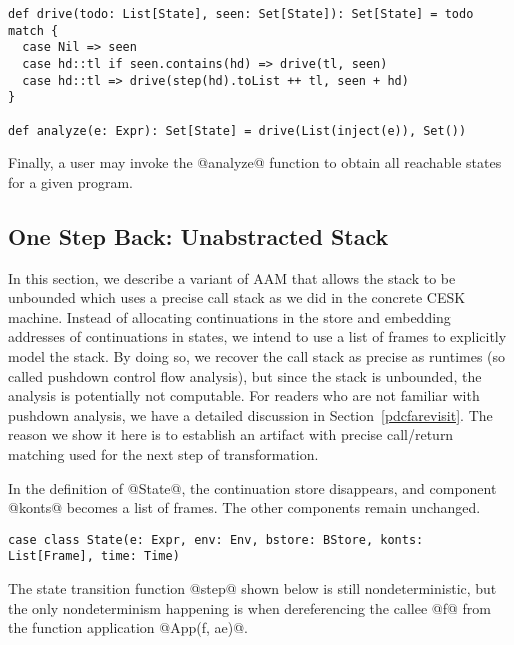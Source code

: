 \documentclass[acmsmall,review,anonymous]{acmart}\settopmatter{printfolios=true,printccs=false,printacmref=false}
\begin{document}
\begin{lstlisting}
def drive(todo: List[State], seen: Set[State]): Set[State] = todo match {
  case Nil => seen
  case hd::tl if seen.contains(hd) => drive(tl, seen)
  case hd::tl => drive(step(hd).toList ++ tl, seen + hd)
}

def analyze(e: Expr): Set[State] = drive(List(inject(e)), Set())
\end{lstlisting}

Finally, a user may invoke the @analyze@ function to obtain all reachable states for a given
program.


\subsection{One Step Back: Unabstracted Stack} \label{unabs}

In this section, we describe a variant of AAM that allows the stack to be
unbounded which uses a precise call stack as we did in the concrete CESK machine.
Instead of allocating continuations in the store and embedding
addresses of continuations in states, we intend to use a list of frames
to explicitly model the stack.
By doing so, we recover the call stack as precise as runtimes
(so called pushdown control flow analysis), but since
the stack is unbounded, the analysis is potentially not computable.
For readers who are not familiar with pushdown analysis, we have a detailed
discussion in Section~\ref{pdcfarevisit}.
The reason we show it here is to establish an artifact with precise call/return matching
used for the next step of transformation.

In the definition of @State@, the continuation store disappears, and
component @konts@ becomes a list of frames. The other components remain unchanged.

\begin{lstlisting}
case class State(e: Expr, env: Env, bstore: BStore, konts: List[Frame], time: Time)
\end{lstlisting}

The state transition function @step@ shown below is still
nondeterministic, but the only nondeterminism happening is when dereferencing the callee @f@
from the function application @App(f, ae)@.
\end{document}
